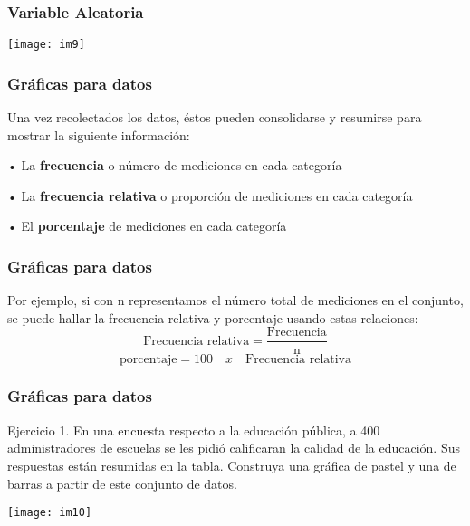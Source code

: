 \documentclass[spanish]{beamer}
\begin{document}
\begin{frame}
\frametitle{Variable Aleatoria}
\texttt{[image: im9]}

\end{frame}
\begin{frame}
\frametitle{Gráficas para datos}
Una vez recolectados los datos, éstos pueden consolidarse y resumirse para mostrar la siguiente información:
\vspace{1em}

• La \textbf{frecuencia} o número de mediciones en cada categoría

• La \textbf{frecuencia relativa} o proporción de mediciones en cada categoría

• El \textbf{porcentaje} de mediciones en cada categoría
\end{frame}

\begin{frame}
\frametitle{Gráficas para datos}
Por ejemplo, si con n representamos el número total de mediciones en el conjunto, se puede hallar la frecuencia relativa y porcentaje usando estas relaciones:
\begin{equation}
\text{Frecuencia relativa} = \frac{\text{Frecuencia}}{\text{n}}
\end{equation}
\begin{equation}
\text{porcentaje} = 100 \quad x \quad \text{Frecuencia relativa} 
\end{equation}
\end{frame}

\begin{frame}
\frametitle{Gráficas para datos}
Ejercicio 1. En una encuesta respecto a la educación pública, a 400 administradores de escuelas se les pidió calificaran la calidad de la educación. Sus respuestas están
resumidas en la tabla. Construya una gráfica de pastel y una de barras a partir de este conjunto de datos. 
\begin{center}
\texttt{[image: im10]}

\end{center}

\end{frame}
\end{document}
